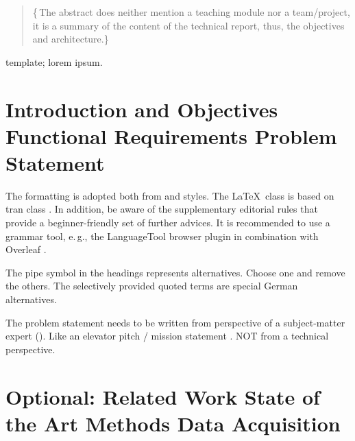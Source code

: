 \documentclass[conference,a4paper,flushend]{neutr}
\begin{document}
\selectlanguage{\NeutrLang}

\maketitle

\begin{abstract}
	\lipsum[1][3-10]
	\{\,\faWarning{}The abstract does neither mention a teaching module nor a team/project,
	it is a summary of the content of the technical report, thus, the objectives and architecture.\}
\end{abstract}

\begin{IEEEkeywords}
	template; lorem ipsum.
\end{IEEEkeywords}

\section{Introduction and Objectives \textbar{} Functional Requirements \textbar{} Problem Statement}

The  formatting is adopted both from  \cite{ieee2018formattingrules} and  \cite{iaria2014formattingrules} styles.
The  \LaTeX\ class is based on tran class \cite{ieee2015howto}.
In addition, be aware of the supplementary  editorial rules \cite{iaria2009editorialrules} \faWarning{} that provide a beginner-friendly set of further advices.
It is recommended to use a grammar tool, e.\,g., the LanguageTool \cite{languagetool} browser plugin in combination with Overleaf \cite{overleaf}.

The pipe symbol \textquote{\textbar{}} in the headings represents alternatives. Choose one and remove the others. The selectively provided quoted terms are special German alternatives.

The problem statement needs to be written from perspective of a subject-matter expert (). Like an elevator pitch / mission statement \faWarning{}. NOT from a technical perspective.

\section{Optional: Related Work \textbar{} State of the Art \textbar{} Methods \textbar{} Data Acquisition}
\lipsum[2]
\end{document}
